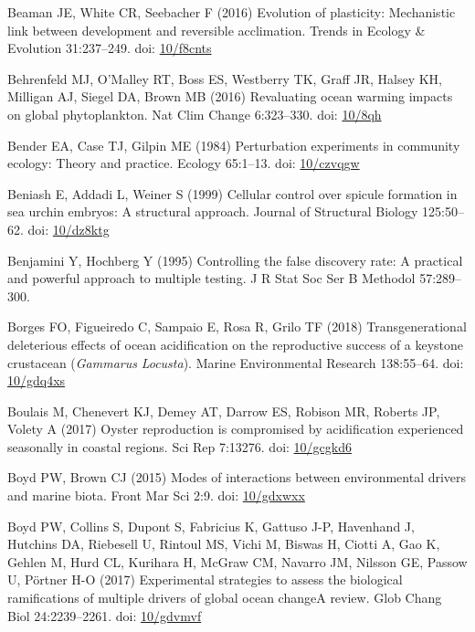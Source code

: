 \documentclass[a4paper,10pt, oneside]{memoir}
\begin{document}
\leavevmode\hypertarget{ref-Beaman2016}{}%
Beaman JE, White CR, Seebacher F (2016) Evolution of plasticity: Mechanistic link between development and reversible acclimation. Trends in Ecology \& Evolution 31:237--249. doi: \href{https://doi.org/10/f8cnts}{10/f8cnts}

\leavevmode\hypertarget{ref-Behrenfeld2016}{}%
Behrenfeld MJ, O'Malley RT, Boss ES, Westberry TK, Graff JR, Halsey KH, Milligan AJ, Siegel DA, Brown MB (2016) Revaluating ocean warming impacts on global phytoplankton. Nat Clim Change 6:323--330. doi: \href{https://doi.org/10/8qh}{10/8qh}

\leavevmode\hypertarget{ref-Bender1984}{}%
Bender EA, Case TJ, Gilpin ME (1984) Perturbation experiments in community ecology: Theory and practice. Ecology 65:1--13. doi: \href{https://doi.org/10/czvqgw}{10/czvqgw}

\leavevmode\hypertarget{ref-Beniash1999}{}%
Beniash E, Addadi L, Weiner S (1999) Cellular control over spicule formation in sea urchin embryos: A structural approach. Journal of Structural Biology 125:50--62. doi: \href{https://doi.org/10/dz8ktg}{10/dz8ktg}

\leavevmode\hypertarget{ref-Benjamini1995}{}%
Benjamini Y, Hochberg Y (1995) Controlling the false discovery rate: A practical and powerful approach to multiple testing. J R Stat Soc Ser B Methodol 57:289--300.

\leavevmode\hypertarget{ref-Borges2018}{}%
Borges FO, Figueiredo C, Sampaio E, Rosa R, Grilo TF (2018) Transgenerational deleterious effects of ocean acidification on the reproductive success of a keystone crustacean (\emph{Gammarus} \emph{Locusta}). Marine Environmental Research 138:55--64. doi: \href{https://doi.org/10/gdq4xs}{10/gdq4xs}

\leavevmode\hypertarget{ref-Boulais2017}{}%
Boulais M, Chenevert KJ, Demey AT, Darrow ES, Robison MR, Roberts JP, Volety A (2017) Oyster reproduction is compromised by acidification experienced seasonally in coastal regions. Sci Rep 7:13276. doi: \href{https://doi.org/10/gcgkd6}{10/gcgkd6}

\leavevmode\hypertarget{ref-Boyd2015}{}%
Boyd PW, Brown CJ (2015) Modes of interactions between environmental drivers and marine biota. Front Mar Sci 2:9. doi: \href{https://doi.org/10/gdxwxx}{10/gdxwxx}

\leavevmode\hypertarget{ref-Boyd2017}{}%
Boyd PW, Collins S, Dupont S, Fabricius K, Gattuso J-P, Havenhand J, Hutchins DA, Riebesell U, Rintoul MS, Vichi M, Biswas H, Ciotti A, Gao K, Gehlen M, Hurd CL, Kurihara H, McGraw CM, Navarro JM, Nilsson GE, Passow U, Pörtner H-O (2017) Experimental strategies to assess the biological ramifications of multiple drivers of global ocean changeA review. Glob Chang Biol 24:2239--2261. doi: \href{https://doi.org/10/gdvmvf}{10/gdvmvf}
\end{document}
